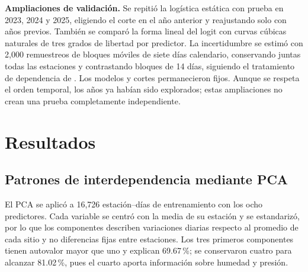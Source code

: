 \documentclass[11pt,letterpaper]{article}
\newenvironment{cambio}{}{}
\begin{document}
\begin{cambio}
\textbf{Ampliaciones de validación.} Se repitió la logística estática con prueba en 2023, 2024 y 2025, eligiendo el corte en el año anterior y reajustando solo con años previos. También se comparó la forma lineal del logit con curvas cúbicas naturales de tres grados de libertad por predictor. La incertidumbre se estimó con 2,000 remuestreos de bloques móviles de siete días calendario, conservando juntas todas las estaciones y contrastando bloques de 14 días, siguiendo el tratamiento de dependencia de \citet{chang2025}. Los modelos y cortes permanecieron fijos. Aunque se respeta el orden temporal, los años ya habían sido explorados; estas ampliaciones no crean una prueba completamente independiente.
\end{cambio}

\clearpage

\section{Resultados}
\subsection{Patrones de interdependencia mediante PCA}
El PCA se aplicó a 16,726 estación--días de entrenamiento con los ocho predictores. Cada variable se centró con la media de su estación y se estandarizó, por lo que los componentes describen variaciones diarias respecto al promedio de cada sitio y no diferencias fijas entre estaciones. Los tres primeros componentes tienen autovalor mayor que uno y explican 69.67\,\%; se conservaron cuatro para alcanzar 81.02\,\%, pues el cuarto aporta información sobre humedad y presión.
\end{document}
